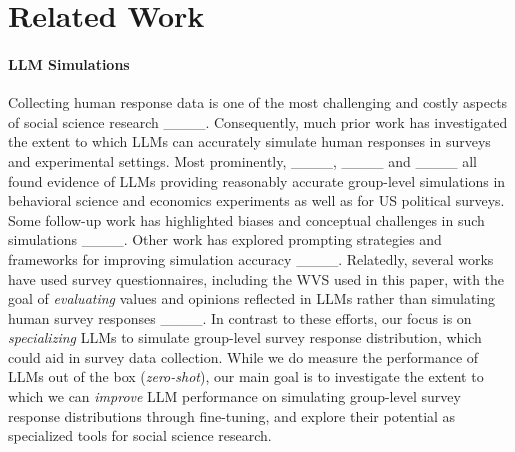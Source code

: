 \section{Related Work}

\paragraph{LLM Simulations}
Collecting human response data is one of the most challenging and costly aspects of social science research ____.
Consequently, much prior work has investigated the extent to which LLMs can accurately simulate human responses in surveys and experimental settings.
Most prominently, ____,  ____ and ____ all found evidence of LLMs providing reasonably accurate group-level simulations in behavioral science and economics experiments as well as for US political surveys.
Some follow-up work has highlighted biases and conceptual challenges in such simulations ____.
Other work has explored prompting strategies and frameworks for improving simulation accuracy ____.
Relatedly, several works have used survey questionnaires, including the WVS used in this paper, with the goal of \textit{evaluating} values and opinions reflected in LLMs rather than simulating human survey responses ____.
In contrast to these efforts, our focus is on \textit{specializing} LLMs to simulate group-level survey response distribution, which could aid in survey data collection.
While we do measure the performance of LLMs out of the box (\textit{zero-shot}), our main goal is to investigate the extent to which we can \textit{improve} LLM performance on simulating group-level survey response distributions through fine-tuning, and explore their potential as specialized tools for social science research.


